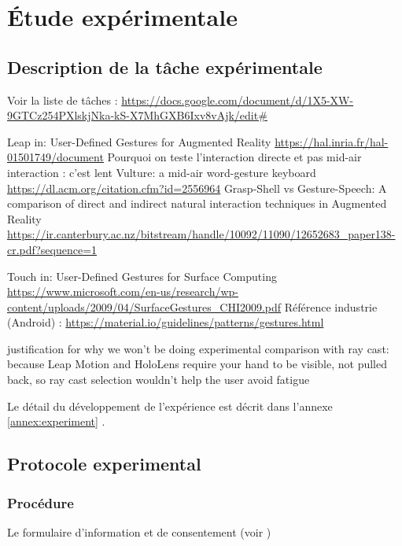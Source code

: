 \chapter{Étude expérimentale}
\label{ch:experiment}

\section{Description de la tâche expérimentale}
\label{sec:experiment_description}

Voir la liste de tâches : \url{https://docs.google.com/document/d/1X5-XW-9GTCz254PXlskjNka-kS-X7MhGXB6Ixv8vAjk/edit#}

Leap in:
User-Defined Gestures for Augmented Reality \url{https://hal.inria.fr/hal-01501749/document}
Pourquoi on teste l'interaction directe et pas mid-air interaction : c'est lent Vulture: a mid-air word-gesture keyboard \url{https://dl.acm.org/citation.cfm?id=2556964}
Grasp-Shell vs Gesture-Speech: A comparison of direct and indirect natural interaction
techniques in Augmented Reality \url{https://ir.canterbury.ac.nz/bitstream/handle/10092/11090/12652683_paper138-cr.pdf?sequence=1}

Touch in:
User-Defined Gestures for Surface Computing \url{https://www.microsoft.com/en-us/research/wp-content/uploads/2009/04/SurfaceGestures_CHI2009.pdf}
Référence industrie (Android) : \url{https://material.io/guidelines/patterns/gestures.html}

justification for why we won’t be doing experimental comparison with ray cast: because Leap Motion and HoloLens require your hand to be visible, not pulled back, so ray cast selection wouldn’t help the user avoid fatigue

Le détail du développement de l'expérience est décrit dans l'annexe \ref{annex:experiment} .


\section{Protocole experimental}
\subsection{Procédure}
Le formulaire d'information et de consentement (voir )

